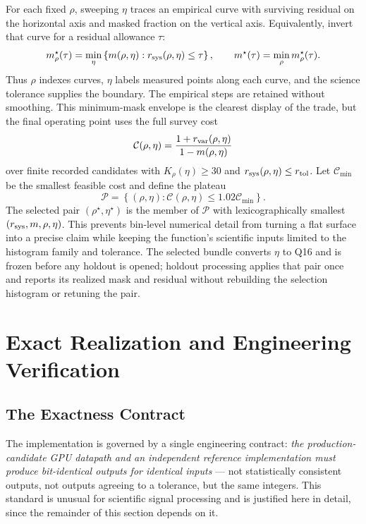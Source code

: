 For each fixed $\rho$, sweeping $\eta$ traces an empirical curve with surviving residual on the horizontal axis and masked fraction on the vertical axis. Equivalently, invert that curve for a residual allowance $\tau$:
\begin{equation}
m_{\rho}^\star(\tau)
=\min_{\eta}\left\{m(\rho,\eta):
r_{\rm sys}(\rho,\eta)\le\tau\right\},
\qquad
m^\star(\tau)=\min_{\rho}m_{\rho}^\star(\tau).
\label{eq:detection:frontier}
\end{equation}
Thus $\rho$ indexes curves, $\eta$ labels measured points along each curve, and the science tolerance supplies the boundary. The empirical steps are retained without smoothing. This minimum-mask envelope is the clearest display of the trade, but the final operating point uses the full survey cost
\begin{equation}
\mathcal C(\rho,\eta)
=\frac{1+r_{\rm var}(\rho,\eta)}{1-m(\rho,\eta)}
\end{equation}
over finite recorded candidates with $K_{\rho}(\eta)\ge30$ and $r_{\rm sys}(\rho,\eta)\le r_{\rm tol}$. Let $\mathcal C_{\min}$ be the smallest feasible cost and define the plateau
\begin{equation}
\mathcal P=\left\{(\rho,\eta):
\mathcal C(\rho,\eta)\le1.02\mathcal C_{\min}\right\}.
\end{equation}
The selected pair $(\rho^\star,\eta^\star)$ is the member of $\mathcal P$ with lexicographically smallest $(r_{\rm sys},m,\rho,\eta)$. This prevents bin-level numerical detail from turning a flat surface into a precise claim while keeping the function's scientific inputs limited to the histogram family and tolerance. The selected bundle converts $\eta$ to Q16 and is frozen before any holdout is opened; holdout processing applies that pair once and reports its realized mask and residual without rebuilding the selection histogram or retuning the pair.

\section{Exact Realization and Engineering Verification}

\subsection{The Exactness Contract}
\label{sec:impl:contract}
The implementation is governed by a single engineering contract: \emph{the production-candidate GPU datapath and an independent reference implementation must produce bit-identical outputs for identical inputs} --- not statistically consistent outputs, not outputs agreeing to a tolerance, but the same integers. This standard is unusual for scientific signal processing and is justified here in detail, since the remainder of this section depends on it.

